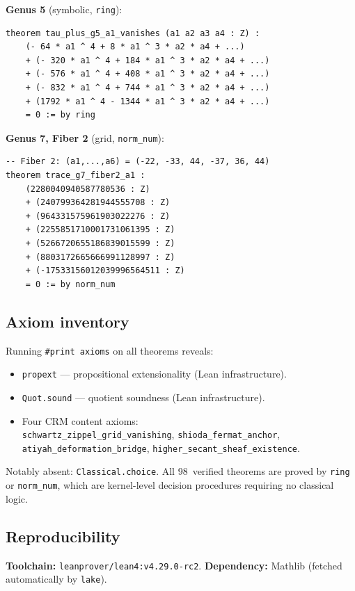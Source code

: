 \documentclass[11pt]{article}
\theoremstyle{plain}
\theoremstyle{definition}
\theoremstyle{remark}
\begin{document}
\noindent\textbf{Genus 5} (symbolic, \texttt{ring}):
\begin{lstlisting}[style=leanstyle]
theorem tau_plus_g5_a1_vanishes (a1 a2 a3 a4 : Z) :
    (- 64 * a1 ^ 4 + 8 * a1 ^ 3 * a2 * a4 + ...)
    + (- 320 * a1 ^ 4 + 184 * a1 ^ 3 * a2 * a4 + ...)
    + (- 576 * a1 ^ 4 + 408 * a1 ^ 3 * a2 * a4 + ...)
    + (- 832 * a1 ^ 4 + 744 * a1 ^ 3 * a2 * a4 + ...)
    + (1792 * a1 ^ 4 - 1344 * a1 ^ 3 * a2 * a4 + ...)
    = 0 := by ring
\end{lstlisting}

\noindent\textbf{Genus 7, Fiber 2} (grid, \texttt{norm\_num}):
\begin{lstlisting}[style=leanstyle]
-- Fiber 2: (a1,...,a6) = (-22, -33, 44, -37, 36, 44)
theorem trace_g7_fiber2_a1 :
    (2280040940587780536 : Z)
    + (240799364281944555708 : Z)
    + (964331575961903022276 : Z)
    + (2255851710001731061395 : Z)
    + (5266720655186839015599 : Z)
    + (8803172665666991128997 : Z)
    + (-17533156012039996564511 : Z)
    = 0 := by norm_num
\end{lstlisting}

\subsection{Axiom inventory}

Running \texttt{\#print axioms} on all theorems reveals:
\begin{itemize}[nosep]
  \item \texttt{propext} --- propositional extensionality (Lean infrastructure).
  \item \texttt{Quot.sound} --- quotient soundness (Lean infrastructure).
  \item Four CRM content axioms:\\
    \texttt{schwartz\_zippel\_grid\_vanishing},
    \texttt{shioda\_fermat\_anchor},\\
    \texttt{atiyah\_deformation\_bridge},
    \texttt{higher\_secant\_sheaf\_existence}.
\end{itemize}
Notably absent: \texttt{Classical.choice}.  All 98~verified theorems are
proved by \texttt{ring} or \texttt{norm\_num}, which are kernel-level
decision procedures requiring no classical logic.

\subsection{Reproducibility}

\textbf{Toolchain:} \texttt{leanprover/lean4:v4.29.0-rc2}.
\textbf{Dependency:} Mathlib (fetched automatically by \texttt{lake}).
\end{document}

